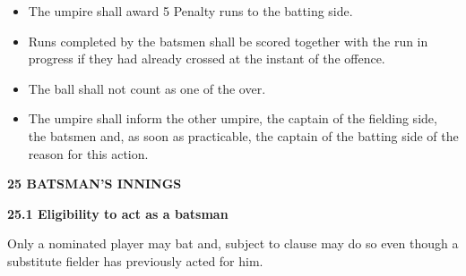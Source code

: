 \documentclass[12pt]{article}
\begin{document}
\vspace{\baselineskip}
\begin{itemize}
	\item {\fontsize{9pt}{10.8pt}\selectfont The umpire shall award 5 Penalty runs to the batting side.\par}\par


\vspace{\baselineskip}
	\item {\fontsize{9pt}{10.8pt}\selectfont Runs completed by the batsmen shall be scored together with the run in progress if they had already crossed at the instant of the offence.\par}\par


\vspace{\baselineskip}
	\item {\fontsize{9pt}{10.8pt}\selectfont The ball shall not count as one of the over.\par}\par


\vspace{\baselineskip}
	\item {\fontsize{9pt}{10.8pt}\selectfont The umpire shall inform the other umpire, the captain of the fielding side, the batsmen and, as soon as practicable, the captain of the batting side of the reason for this action.\par}
\end{itemize}\par


\vspace{\baselineskip}
{\fontsize{16pt}{19.2pt}\selectfont \textbf{25 BATSMAN’S INNINGS}\par}\par


\vspace{\baselineskip}
{\fontsize{11pt}{13.2pt}\selectfont \textbf{25.1 \tabto{0.47in} Eligibility to act as a batsman}\par}\par


\vspace{\baselineskip}
\begin{adjustwidth}{0.0in}{0.49in}
{\fontsize{9pt}{10.8pt}\selectfont Only a nominated player may bat and, subject to clause may do so even though a substitute fielder has previously acted for him.\par}\par

\end{adjustwidth}
\end{document}

